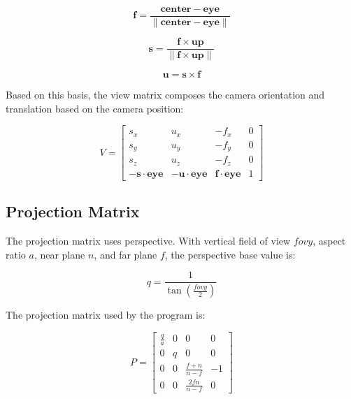 \documentclass[12pt,a4paper]{article}
\begin{document}
\begin{equation}
    \mathbf{f} =
    \frac{\mathbf{center} - \mathbf{eye}}
    {\|\mathbf{center} - \mathbf{eye}\|}
\end{equation}

\begin{equation}
    \mathbf{s} =
    \frac{\mathbf{f} \times \mathbf{up}}
    {\|\mathbf{f} \times \mathbf{up}\|}
\end{equation}

\begin{equation}
    \mathbf{u} = \mathbf{s} \times \mathbf{f}
\end{equation}

Based on this basis, the view matrix composes the camera orientation and
translation based on the camera position:

\begin{equation}
    V =
    \begin{bmatrix}
        s_x & u_x & -f_x & 0 \\
        s_y & u_y & -f_y & 0 \\
        s_z & u_z & -f_z & 0 \\
        -\mathbf{s}\cdot\mathbf{eye} &
        -\mathbf{u}\cdot\mathbf{eye} &
        \mathbf{f}\cdot\mathbf{eye} & 1
    \end{bmatrix}
\end{equation}

\subsection{Projection Matrix}

The projection matrix uses perspective. With vertical field of view $fovy$,
aspect ratio $a$, near plane $n$, and far plane $f$, the perspective base value is:

\begin{equation}
    q = \frac{1}{\tan\left(\frac{fovy}{2}\right)}
\end{equation}

The projection matrix used by the program is:

\begin{equation}
    P =
    \begin{bmatrix}
        \frac{q}{a} & 0 & 0 & 0 \\
        0 & q & 0 & 0 \\
        0 & 0 & \frac{f+n}{n-f} & -1 \\
        0 & 0 & \frac{2fn}{n-f} & 0
    \end{bmatrix}
\end{equation}
\end{document}
